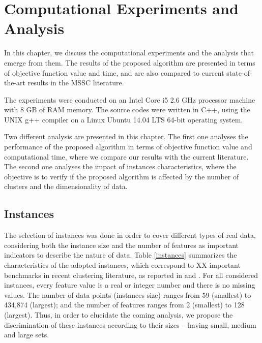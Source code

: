 \chapter{Computational Experiments and Analysis}
\label{chap:experiments}
In this chapter, we discuss the computational experiments and the analysis that emerge from them. The results of the proposed algorithm are presented in terms of objective function value and time, and are also compared to current state-of-the-art results in the MSSC literature.

The experiments were conducted on an Intel Core i5 2.6 GHz processor machine with 8 GB of RAM memory. The source codes were written in C++, using the UNIX g++ compiler on a Linux Ubuntu 14.04 LTS 64-bit operating system.

Two different analysis are presented in this chapter. The first one analyses the performance of the proposed algorithm in terms of objective function value and computational time, where we compare our results with the current literature. The second one analyses the impact of instances characteristics, where the objective is to verify if the proposed algorithm is affected by the number of clusters and the dimensionality of data.

\section{Instances}
\label{sec:instances}
The selection of instances was done in order to cover different types of real data, considering both the instance size and the number of features as important indicators to describe the nature of data. Table \ref{instances} summarizes the characteristics of the adopted instances, which correspond to XX important benchmarks in recent clustering literature, as reported in \cite{Ordin2014} and \cite{Bagirov2016}. For all considered instances, every feature value is a real or integer number and there is no missing values. The number of data points (instances size) ranges from 59 (smallest) to 434,874 (largest); and the number of features ranges from 2 (smallest) to 128 (largest). Thus, in order to elucidate the coming analysis, we propose the discrimination of these instances according to their sizes -- having small, medium and large sets. %



